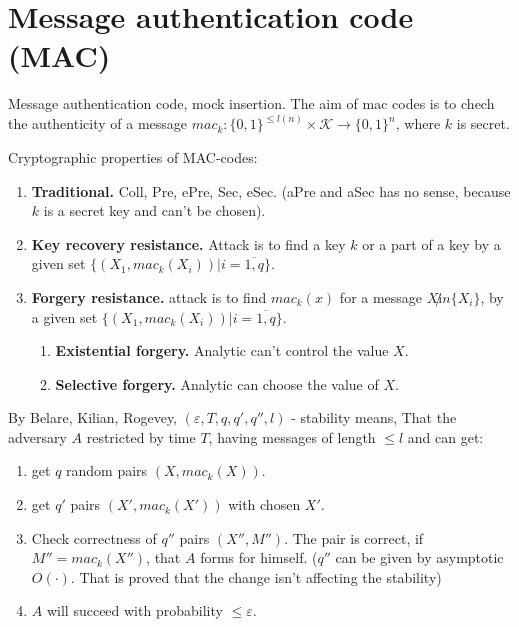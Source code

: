 \section{Message authentication code (MAC)}

Message authentication code, mock insertion.
The aim of mac codes is to chech the authenticity of a message
$mac_k: \{0, 1\}^{\leqslant l(n)} \times \mathcal{K} \rightarrow \{0, 1\}^{n}$,
where $k$ is secret.

Cryptographic properties of MAC-codes:
\begin{enumerate}
    \item \textbf{Traditional.} Coll, Pre, ePre, Sec, eSec. (aPre and aSec has no sense,
        because $k$ is a secret key and can't be chosen).
    \item \textbf{Key recovery resistance.} Attack is to find a key $k$ or a part of a key
        by a given set $\{(X_1, mac_k(X_i)) | i = \overline{1, q}\}$.
    \item \textbf{Forgery resistance.} attack is to find $mac_k(x)$ for a message $X \not in \{X_i\}$,
        by a given set $\{(X_1, mac_k(X_i)) | i = \overline{1, q}\}$.
        \begin{enumerate}
            \item \textbf{Existential forgery.} Analytic can't control the value $X$.
            \item \textbf{Selective forgery.} Analytic can choose the value of $X$.
        \end{enumerate}
\end{enumerate}

\begin{definition}
    By Belare, Kilian, Rogevey, $(\varepsilon, T, q, q', q'', l)$ - stability means,
    That the adversary $A$ restricted by time $T$, having messages of length
    $\leqslant l$ and can get:
    \begin{enumerate}[noitemsep]
        \item get $q$ random pairs $(X, mac_k(X))$.
        \item get $q'$ pairs $(X', mac_k(X'))$ with chosen $X'$.
        \item Check correctness of $q''$ pairs $(X'', M'')$. The pair is correct,
            if $M'' = mac_k(X'')$, that $A$ forms for himself.
            ($q''$ can be given by asymptotic $O(\cdot)$. That is proved that
            the change isn't affecting the stability)
        \item $A$ will succeed with probability $\leqslant \varepsilon$.
    \end{enumerate}
\end{definition}

